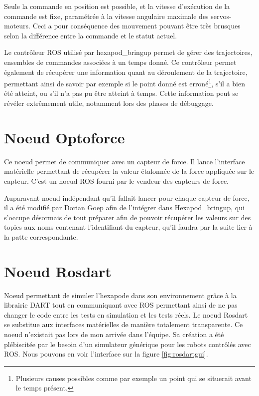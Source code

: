 \documentclass{tnreport}
\begin{document}
Seule la commande en position est possible, et la vitesse d'exécution de la commande est fixe, paramétrée à la vitesse angulaire maximale des servos-moteurs. Ceci a pour conséquence des mouvement pouvant être très brusques selon la différence entre la commande et le statut actuel. 

Le contrôleur \gls{ROS} utilisé par hexapod\_bringup permet de gérer des trajectoires, ensembles de commandes associées à un temps donné. Ce contrôleur permet également de récupérer une information quant au déroulement de la trajectoire, permettant ainsi de savoir par exemple si le point donné est erroné\footnote{Plusieurs causes possibles comme par exemple un point qui se situerait avant le temps présent.}, s'il a bien été atteint, ou s'il n'a pas pu être atteint à temps. Cette information peut se révéler extrêmement utile, notamment lors des phases de débuggage. 

\clearpage
\section{Noeud Optoforce}
Ce noeud permet de communiquer avec un capteur de force. Il lance l'interface matérielle permettant de récupérer la valeur étalonnée de la force appliquée sur le capteur. C'est un noeud ROS fourni par le vendeur des capteurs de force. 

Auparavant noeud indépendant qu'il fallait lancer pour chaque capteur de force, il a été modifié par Dorian Goep afin de l'intégrer dans Hexapod\_bringup, qui s'occupe désormais de tout préparer afin de pouvoir récupérer les valeurs sur des topics aux noms contenant l'identifiant du capteur, qu'il faudra par la suite lier à la patte correspondante. 

\section{Noeud Rosdart}\label{lb:rosdart}
Noeud permettant de simuler l'hexapode dans son environnement grâce à la librairie \gls{DART} tout en communiquant avec \gls{ROS} permettant ainsi de ne pas changer le code entre les tests en simulation et les tests réels. Le noeud Rosdart se substitue aux interfaces matérielles de manière totalement transparente. Ce noeud n'existait pas lors de mon arrivée dans l'équipe. Sa création a été plébiscitée par le besoin d'un simulateur générique pour les robots contrôlés avec \gls{ROS}. Nous pouvons en voir l'interface sur la figure \ref{fig:rosdartgui}.
\end{document}

